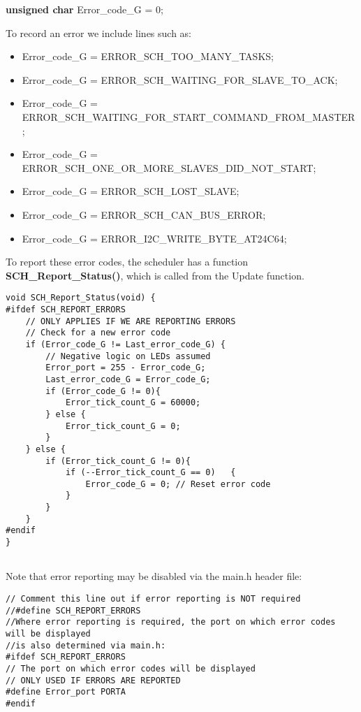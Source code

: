 \textbf{unsigned char} Error\_code\_G = 0;

To record an error we include lines such as:
\begin{itemize}
   \item Error\_code\_G = ERROR\_SCH\_TOO\_MANY\_TASKS;
    \item Error\_code\_G = ERROR\_SCH\_WAITING\_FOR\_SLAVE\_TO\_ACK;
    \item Error\_code\_G = ERROR\_SCH\_WAITING\_FOR\_START\_COMMAND\_FROM\_MASTER;
    \item Error\_code\_G = ERROR\_SCH\_ONE\_OR\_MORE\_SLAVES\_DID\_NOT\_START;
    \item Error\_code\_G = ERROR\_SCH\_LOST\_SLAVE;
    \item Error\_code\_G = ERROR\_SCH\_CAN\_BUS\_ERROR;
    \item Error\_code\_G = ERROR\_I2C\_WRITE\_BYTE\_AT24C64;
\end{itemize}
To report these error codes, the scheduler has a function \textbf{SCH\_Report\_Status()},
which is called from the Update function.

\begin{lstlisting}[basicstyle=\small, caption=An implementation of the ‘report status’ function]
void SCH_Report_Status(void) {
#ifdef SCH_REPORT_ERRORS
    // ONLY APPLIES IF WE ARE REPORTING ERRORS
    // Check for a new error code
    if (Error_code_G != Last_error_code_G) {
        // Negative logic on LEDs assumed
        Error_port = 255 - Error_code_G;
        Last_error_code_G = Error_code_G;
        if (Error_code_G != 0){
            Error_tick_count_G = 60000;
        } else {
            Error_tick_count_G = 0;
        } 
    } else {
        if (Error_tick_count_G != 0){
            if (--Error_tick_count_G == 0)   {
                Error_code_G = 0; // Reset error code
            }    
        } 
    }
#endif
}


\end{lstlisting}

Note that error reporting may be disabled via the main.h header file:
\begin{lstlisting}[basicstyle=\small, caption=Define a constant to allow errors are reported]
// Comment this line out if error reporting is NOT required
//#define SCH_REPORT_ERRORS
//Where error reporting is required, the port on which error codes will be displayed
//is also determined via main.h:
#ifdef SCH_REPORT_ERRORS
// The port on which error codes will be displayed
// ONLY USED IF ERRORS ARE REPORTED
#define Error_port PORTA
#endif

\end{lstlisting}

